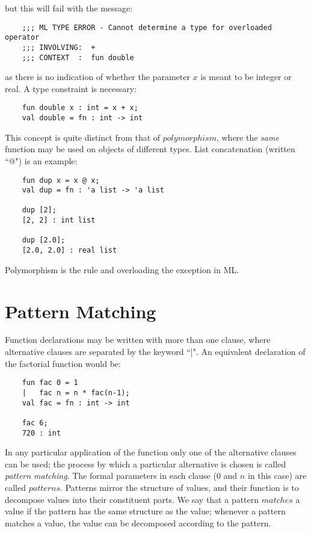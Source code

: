 but this will fail with the message:
\begin{verbatim}
    ;;; ML TYPE ERROR - Cannot determine a type for overloaded operator
    ;;; INVOLVING:  +
    ;;; CONTEXT  :  fun double
\end{verbatim}

as there is no indication of whether the parameter $x$ is meant to be
integer or real. A type constraint is necessary:
\begin{verbatim}
    fun double x : int = x + x;
    val double = fn : int -> int
\end{verbatim}

This concept is quite distinct from that of $polymorphism$, where the
{\em same} function may be used on objects of different types. List
concatenation (written ``@") is an example:
\begin{verbatim}
    fun dup x = x @ x;
    val dup = fn : 'a list -> 'a list

    dup [2];
    [2, 2] : int list

    dup [2.0];
    [2.0, 2.0] : real list
\end{verbatim}

Polymorphism is the rule and overloading the exception in ML.


\section{Pattern Matching}

Function declarations may be written with more than one clause, where
alternative clauses are separated by the keyword ``|". An equivalent
declaration of the factorial function would be:
\begin{verbatim}
    fun fac 0 = 1
    |   fac n = n * fac(n-1);
    val fac = fn : int -> int

    fac 6;
    720 : int
\end{verbatim}

In any particular application of the function only one of the
alternative clauses can be used; the process by which a particular
alternative is chosen is called {\em pattern matching}. The formal
parameters in each clause (0 and $n$ in this case) are called
$patterns$. Patterns mirror the structure of values, and their function
is to decompose values into their constituent parts. We say that a
pattern $matches$ a value if the pattern has the same structure as the
value; whenever a pattern matches a value, the value can be decomposed
according to the pattern.

